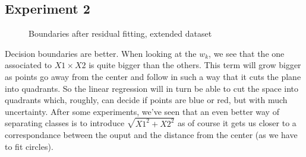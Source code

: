 \documentclass{article}
\begin{document}
\subsection{Experiment 2}
	\begin{figure}[H]
	\centering
	
	\caption{\label{resfit1}Boundaries after residual fitting, extended dataset}
     \end{figure}

Decision boundaries are better.
When looking at the $w_k$, we see that the one associated to $X1 \times X2$ is quite bigger than the others. This term will grow bigger as points go away from the center and follow in such a way that it cuts the plane into quadrants. So the linear regression will in turn be able to cut the space into quadrants which, roughly, can decide if points are blue or red, but with much uncertainty. After some experiments, we've seen that an even better way of separating classes is to introduce $\sqrt{X1 ^ 2 + X2 ^ 2}$ as of course it gets us closer to a correspondance between the ouput and the distance from the center (as we have to fit circles).

\end{document}
